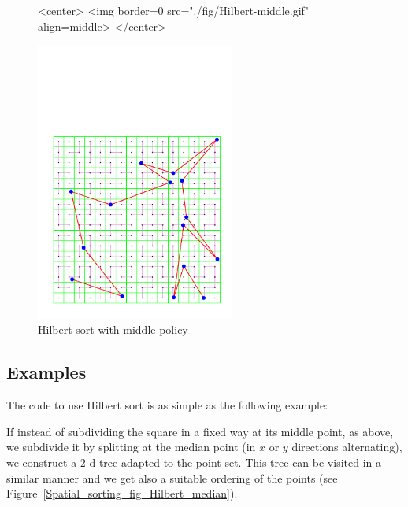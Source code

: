 \begin{figure}[h]
\begin{ccHtmlOnly}
<center>
<img border=0 src="./fig/Hilbert-middle.gif" align=middle>
</center>
\end{ccHtmlOnly} 
\begin{ccTexOnly}
\begin{center}
\includegraphics[width=6.5cm]{Spatial_sorting/fig/Hilbert-middle}
\end{center}
\end{ccTexOnly}
\caption{Hilbert sort with middle policy
\label{Spatial_sorting_fig_Hilbert_middle}}
\end{figure}

\begin{ccTexOnly}
\newpage
\end{ccTexOnly}

\subsection{Examples}

The code to use Hilbert sort is as simple as the following example:



If instead of subdividing the square in a fixed way at its middle point,
 as above, we subdivide it
by splitting at the median point (in $x$ or $y$ directions alternating),
we construct a 2-d tree adapted to the point set. This tree can be visited in a
similar manner and we get also a suitable ordering of the points
(see Figure~\ref{Spatial_sorting_fig_Hilbert_median}).


